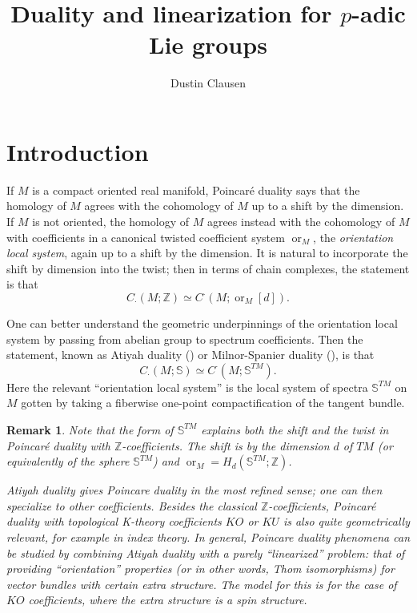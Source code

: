 \documentclass[12pt]{article}
\newtheorem{remark}[theorem]{Remark}
\newcommand{\on}{\operatorname}
\newcommand{\mbb}{\mathbb}
\begin{document}
\title{Duality and linearization for $p$-adic Lie groups}
\author{Dustin Clausen}

\maketitle

\section{Introduction}

If $M$ is a compact oriented real manifold, Poincaré duality says that the homology of $M$ agrees with the cohomology of $M$ up to a shift by the dimension.  If $M$ is not oriented, the homology of $M$ agrees instead with the cohomology of $M$ with coefficients in a canonical twisted coefficient system $\on{or}_M$, the \emph{orientation local system}, again up to a shift by the dimension.  It is natural to incorporate the shift by dimension into the twist; then in terms of chain complexes, the statement is that
$$C_\cdot(M;\mbb{Z}) \simeq C^\cdot(M;\on{or}_M[d]).$$

One can better understand the geometric underpinnings of the orientation local system by passing from abelian group to spectrum coefficients.  Then the statement, known as Atiyah duality (\cite{AtiyahDuality}) or Milnor-Spanier duality (\cite{MilnorDuality}), is that
$$C_\cdot(M;\mbb{S}) \simeq C^\cdot(M;\mbb{S}^{TM}).$$
Here the relevant ``orientation local system'' is the local system of spectra $\mbb{S}^{TM}$ on $M$ gotten by taking a fiberwise one-point compactification of the tangent bundle.

\begin{remark}
Note that the form of $\mbb{S}^{TM}$ explains both the shift and the twist in Poincaré duality with $\mbb{Z}$-coefficients.  The shift is by the dimension $d$ of $TM$ (or equivalently of the sphere $\mbb{S}^{TM}$) and $\on{or}_M=H_d(\mbb{S}^{TM};\mbb{Z})$.

Atiyah duality gives Poincare duality in the most refined sense; one can then specialize to other coefficients. Besides the classical $\mbb{Z}$-coefficients, Poincaré duality with topological K-theory coefficients $KO$ or $KU$ is also quite geometrically relevant, for example in index theory.  In general, Poincare duality phenomena can be studied by combining Atiyah duality with a purely ``linearized'' problem: that of providing ``orientation'' properties (or in other words, Thom isomorphisms) for vector bundles with certain extra structure.  The model for this is \cite{AtiyahOrientation} for the case of $KO$ coefficients, where the extra structure is a spin structure.
\end{remark}
\end{document}
